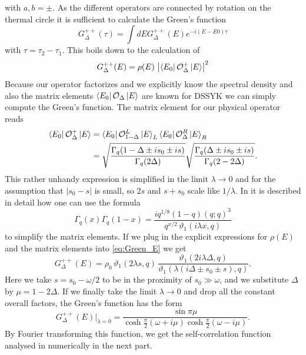 \documentclass{article}
\numberwithin{equation}{section}
\begin{document}
with $a, b = \pm$. As the different operators are connected by rotation on the thermal circle it is sufficient to calculate the Green's function 
\begin{equation}
    G^{++}_\Delta (\tau) = \int dE G^{++}_\Delta (E) e^{-i(E-E0)\tau}
\end{equation}
with $\tau = \tau_2 -\tau_1$. This boils down to the calculation of
\begin{equation}
    G^{++}_\Delta (E) = \rho(E) \, \left| \bra{E_0} \mathcal{O}^+_\Delta \ket{E} \right|^2
    \label{eq:Green_E}
\end{equation}
Because our operator factorizes and we explicitly know the spectral density and also the matrix elements $\bra{E_0}\mathcal{O}_\Delta \ket{E}$ are known for DSSYK we can simply compute the Green's function. The matrix element for our physical operator reads
\begin{align}
    \bra{E_0} \mathcal{O}^+_\Delta \ket{E} &= \bra{E_0} \mathcal{O}^L_{1-\Delta} \ket{E}_L \bra{E_0} \mathcal{O}^R_\Delta \ket{E}_R \\
    &= \sqrt{\frac{\Gamma_q(1- \Delta \pm i s_0 \pm i s)}{\Gamma_q(2 \Delta)}} \sqrt{\frac{\Gamma_q(\Delta \pm i s_0 \pm i s)}{\Gamma_q(2 - 2 \Delta)}}. \nonumber
\end{align}
This rather unhandy expression is simplified in the limit $\lambda \rightarrow 0$ and for the assumption that $|s_0 - s|$ is small, so $2s$ and $s + s_0$ scale like $1/\lambda$. 
In \cite{Narovlansky:2023lfz} it is described in detail how one can use the formula
\begin{equation}
    \Gamma_q(x) \Gamma_q(1-x) = \frac{i q^{1/8} (1-q) (q;q)^3}{q^{x/2} \, \vartheta_1(i \lambda x, q)}
\end{equation}
to simplify the matrix elements. If we plug in the explicit expressions for $\rho(E)$ and the matrix elements into \eqref{eq:Green_E} we get
\begin{equation}
    G^{++}_\Delta(E) = \rho_0 \, \vartheta_1(2 \lambda s, q) \, \frac{\vartheta_1(2 i \lambda \Delta, q)}{\vartheta_1(\lambda(i \Delta \pm s_0 \pm s), q)}.
\end{equation}
Here we take $s = s_0 - \omega /2$ to be in the proximity of $s_0 \gg \omega$, and we substitute $\Delta$ by $\mu = 1- 2\Delta$. If we finally take the limit $\lambda\rightarrow0$ and drop all the constant overall factors, the Green's function has the form
\begin{equation}
    G^{++}_\Delta (E)|_{\lambda = 0} = \frac{\sin{\pi \mu}}{\cosh{\frac{\pi}{2}(\omega + i \mu)} \cosh{\frac{\pi}{2}(\omega -i \mu) }}.
\end{equation}
By Fourier transforming this function, we get the self-correlation function analysed in numerically in the next part.
\end{document}
